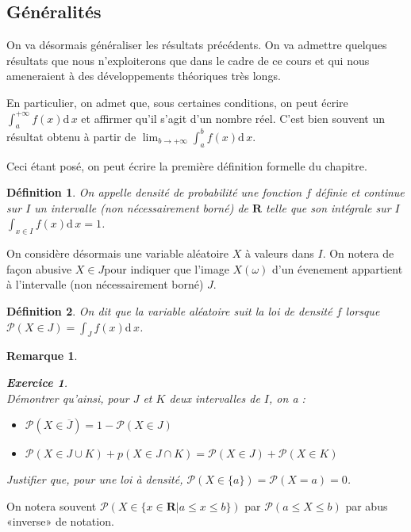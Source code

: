 \documentclass[11pt,a4paper,french]{article}
\newcommand{\R}{\mathbf{R}}
\newcommand{\diff}[1]{\mathrm{d}\,#1}
\newcommand{\p}{\mathcal{P}}
\theoremstyle{break}
\newtheorem{definition}{Définition}
\theoremstyle{plain}
\newtheorem{exerciceT}{Exercice}
\theoremstyle{nonumberplain}
\newtheorem{remarque}{Remarque}
\theoremstyle{nonumberbreak}
\newenvironment{exercice}{\begin{framed}\begin{exerciceT}}{\end{exerciceT}\end{framed}}
\begin{document}
\subsection{Généralités}

On va désormais généraliser les résultats précédents. On va admettre
quelques résultats que nous n'exploiterons que dans le cadre de ce cours
et qui nous ameneraient à des développements théoriques très longs.

En particulier, on admet que, sous certaines conditions, on peut écrire
$\int_a^{+\infty}f(x)\diff x$ et affirmer qu'il s'agit d'un nombre réel.
C'est bien souvent un résultat obtenu à partir de
$\lim_{b\to+\infty}\int_a^b f(x) \diff x$.

Ceci étant posé, on peut écrire la première définition formelle du
chapitre.

\begin{definition}
  On appelle \emph{densité de probabilité} une fonction $f$ définie et
  continue sur $I$ un intervalle (non nécessairement borné) de $\R$
  telle que son intégrale sur $I$ $\int_{x\in I}f(x) \diff x = 1$.
\end{definition}

On considère désormais une variable aléatoire $X$ à valeurs dans $I$. On
notera de façon abusive $X \in J$pour indiquer que l'image $X(\omega)$
d'un évenement appartient à l'intervalle (non nécessairement borné) $J$.

\begin{definition}
  On dit que la variable aléatoire \emph{suit la loi de densité $f$}
  lorsque $\p(X\in J) = \int_{J} f(x)\diff{x}$.
\end{definition}

\begin{remarque}
  \begin{exercice}~\\
    Démontrer qu'ainsi, pour $J$ et $K$ deux intervalles de $I$, on a :
    \begin{itemize}
      \item $\p(X\in \overline{J}) = 1 - \p(X\in J)$
      \item $\p(X\in J \cup K) + p(X\in J \cap K) = \p(X\in J) + \p(X\in K)$
    \end{itemize}
    Justifier que, pour une loi à densité, $\p(X \in \{a\}) = \p(X = a)
    = 0$.
  \end{exercice}
\end{remarque}

On notera souvent $\p(X\in \{x\in \R | a\leqslant x \leqslant b\})$ par
$\p(a \leqslant X \leqslant b)$ par abus «inverse» de notation.
\end{document}
